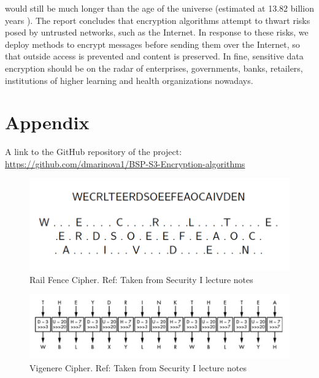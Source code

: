 would still be much longer than the age of the universe (estimated at 13.82 billion years \cite{universe}). The report concludes that encryption algorithms attempt to thwart risks posed by untrusted networks, such as the Internet. In response to these risks, we deploy methods to encrypt messages before sending them over the Internet, so that outside access is prevented and content is preserved. In fine, sensitive data encryption should be on the radar of enterprises, governments, banks, retailers, institutions of higher learning and health organizations nowadays.


\newpage 
\section{Appendix}
A link to the GitHub repository of the project: \url{https://github.com/dmarinova1/BSP-S3-Encryption-algorithms}

\begin{figure}[h!]
  \includegraphics[width=\linewidth]{railfence.jpg}
  \caption{Rail Fence Cipher. Ref: Taken from Security I lecture notes}
  \label{fig:railfence}
\end{figure}

\begin{figure}[h!]
  \includegraphics[width=\linewidth]{vigenere.jpg}
  \caption{Vigenere Cipher. Ref: Taken from Security I lecture notes}
  \label{fig:vigenere}
\end{figure}

